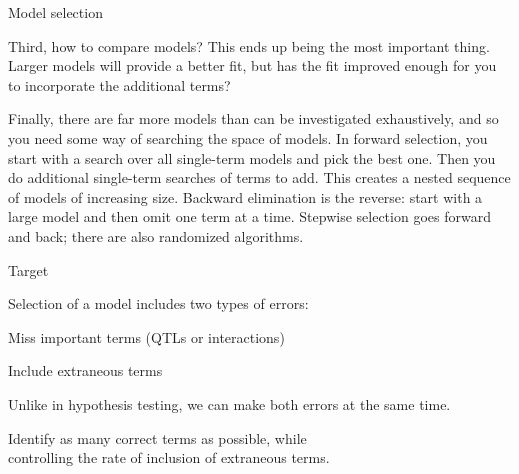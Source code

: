 \documentclass[aspectratio=169,12pt,t]{beamer}
\begin{document}
\begin{frame}[c]{Model selection}
{  Third, how to compare models? This ends up being the most important
  thing. Larger models will provide a better fit, but has the fit
  improved enough for you to incorporate the additional terms?

  Finally, there are far more models than can be investigated
  exhaustively, and so you need some way of searching the space of
  models. In forward selection, you start with a search over all
  single-term models and pick the best one. Then you do additional
  single-term searches of terms to add. This creates a nested sequence
  of models of increasing size. Backward elimination is the reverse:
  start with a large model and then omit one term at a time. Stepwise
  selection goes forward and back; there are also randomized algorithms.
}
\end{frame}









\begin{frame}{Target}


\bbi

\item Selection of a model includes two types of errors:
\bi
\item Miss important terms (QTLs or interactions)
\item Include extraneous terms
\ei

\item Unlike in hypothesis testing, we can make {\hilit both errors} at
the same time.

\item {\hilit Identify as many correct terms as possible, while \\
{\vhilit controlling the rate of inclusion of extraneous terms}.}
\ei

\end{frame}
\end{document}
